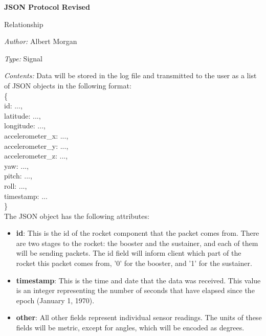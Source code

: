 \documentclass[10pt,draftclsnofoot,onecolumn]{IEEEtran}
\newcommand{\newrelationship}[4]{
	\noindent\textbf{#2}
	
	\noindent Relationship
	
	\noindent\textit{Author:} #1

	\noindent\textit{Type:} #3

	\noindent\textit{Contents:} #4

	\vspace{.5cm}
}
\begin{document}
	\newrelationship
	{Albert Morgan}
	{JSON Protocol Revised}
	{Signal}
	{
		Data will be stored in the log file and transmitted to the user as a list of JSON objects in the following format:\\


\noindent\{\\
\hspace*{.5cm}id: ...,\\
\hspace*{.5cm}latitude: ...,\\
\hspace*{.5cm}longitude: ...,\\
\hspace*{.5cm}accelerometer\_x: ...,\\
\hspace*{.5cm}accelerometer\_y: ...,\\
\hspace*{.5cm}accelerometer\_z: ...,\\
\hspace*{.5cm}yaw: ...,\\
\hspace*{.5cm}pitch: ...,\\
\hspace*{.5cm}roll: ...,\\
\hspace*{.5cm}timestamp: ...\\
\}\\

		The JSON object has the following attributes:
		\begin{itemize}
			\item\textbf{id}: This is the id of the rocket component that the packet comes from. There are two stages to the rocket: the booster and the sustainer, and each of them will be sending packets.
The id field will inform client which part of the rocket this packet comes from, '0' for the booster, and '1' for the sustainer.
			\item\textbf{timestamp}: This is the time and date that the data was received.
			This value is an integer representing the number of seconds that have elapsed since the epoch (January 1, 1970).
			\item\textbf{other}: All other fields represent individual sensor readings. The units of these fields will be metric, except for angles, which will be encoded as degrees.
		\end{itemize}
}
\end{document}

